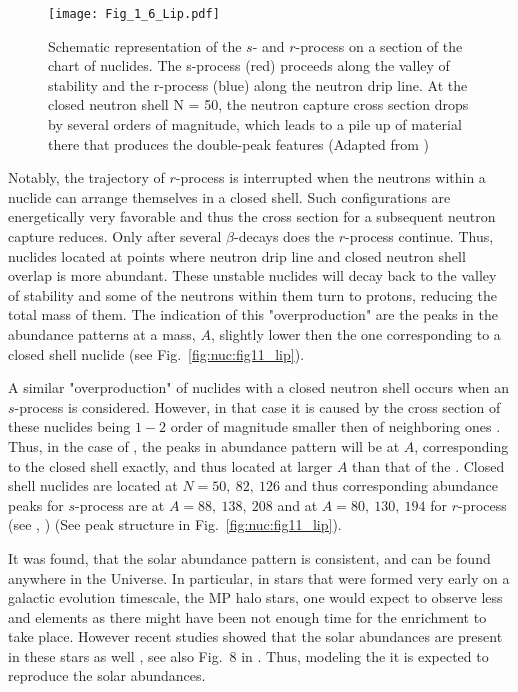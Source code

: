 \begin{figure}[t]
    \centering
    \texttt{[image: Fig\_1\_6\_Lip.pdf]}
    \caption{Schematic representation of the $s$- and $r$-process on a section of the
        chart of nuclides. The s-process (red) proceeds along the valley of stability and the
        r-process (blue) along the neutron drip line. At the closed neutron shell N = 50, the
        neutron capture cross section drops by several orders of magnitude, which leads to a
        pile up of material there that produces the double-peak features
        (Adapted from \citet{Lippuner:2018phd})
    }
    \label{fig:nuc:fig16_lip}
\end{figure}
%
Notably, the trajectory of $r$-process is interrupted when the neutrons within a nuclide can arrange 
themselves in a closed shell. Such configurations are energetically very favorable and thus the cross 
section for a subsequent neutron capture reduces. Only after several $\beta$-decays does the 
$r$-process continue. Thus, nuclides located at points where neutron drip line and closed neutron 
shell overlap is more abundant. These unstable nuclides will decay back to the valley of stability 
and some of the neutrons within them turn to protons, reducing the total mass of them. The indication 
of this "overproduction" are the peaks in the abundance patterns at a mass, $A$, slightly lower then 
the one corresponding to a closed shell nuclide (see Fig.~\ref{fig:nuc:fig11_lip}).


A similar "overproduction" of nuclides with a closed neutron shell occurs when an $s$-process 
is considered. However, in that case it is caused by the cross section of these nuclides being 
$1-2$ order of magnitude smaller then of neighboring ones \citep{Rolfs:1988}. Thus, in the case of 
\sproc{}, the peaks in abundance pattern will be at $A$, corresponding to the closed shell exactly, 
and thus located at larger $A$ than that of the \rproc{}. Closed shell nuclides are located at 
$N=50,\: 82, \: 126$ and thus corresponding abundance peaks for $s$-process are at 
$A=88, \: 138, \: 208$ and at $A=80,\:130,\:194$ for $r$-process (see \eg, \citet{Arnould:2007gh}) 
(See peak structure in Fig.~\ref{fig:nuc:fig11_lip}).

It was found, that the solar \rproc{} abundance pattern is consistent, and can be found anywhere in the 
Universe. In particular, in stars that were formed very early on a galactic evolution timescale, the 
\ac{MP} halo stars, one would expect to observe less \sproc{} and \rproc{} elements as there might have 
been not enough time for the enrichment to take place. However recent studies showed that the solar 
\rproc{} abundances are present in these stars as well \citep{Sneden:2008,Roederer:2010}, 
see also Fig.~$8$ in \citet{Sneden:2009}. Thus, modeling the \rproc{} \nuc{} it is expected to 
reproduce the solar abundances.

